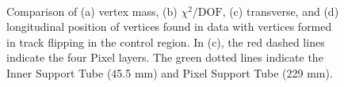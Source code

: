 \begin{figure}[!htb]
    \centering
     \\
    \caption{Comparison of (a) vertex mass, (b) $\chi^{2} / \mathrm{DOF}$, (c) transverse, and (d) longitudinal position of vertices found in data with vertices formed in track flipping in the control region. In (c), the red dashed lines indicate the four Pixel layers. The green dotted lines indicate the Inner Support Tube (45.5 mm) and Pixel Support Tube (229 mm).}
    \label{fig:random-crossing_vertex_dist_data}
\end{figure}

